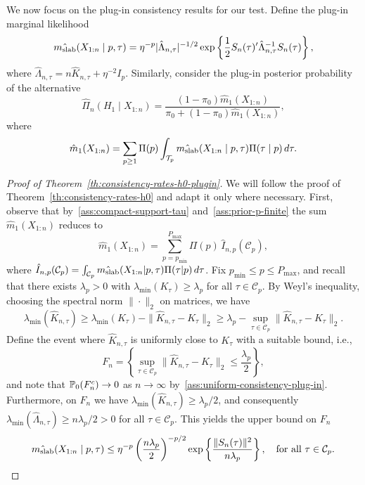 We now focus on the plug-in consistency results for our test. Define the plug-in marginal likelihood
\[
\hat {m_{\text{slab}}}(X_{1:n}\mid p,\tau) = \eta^{-p}|\hat\Lambda_{n,\tau}|^{-1/2}\exp\left\{\frac{1}{2}S_n(\tau)'\hat\Lambda_{n,\tau}^{-1}S_n(\tau)\right\},
\]
where \(\hat\Lambda_{n,\tau} = n\hat K_{n,\tau} + \eta^{-2}I_p \). Similarly, consider the plug-in posterior probability of the alternative
\[
\hat\Pi_n(H_1\mid X_{1:n}) = \frac{(1-\pi_0)\hat m_1(X_{1:n})}{\pi_0 + (1-\pi_0)\hat m_1(X_{1:n})},
\]
where
\[
\hat m_1(X_{1:n}) = \sum_{p\geq 1}\Pi(p)\int_{\mathcal T_p}\hat {m_{\text{slab}}}(X_{1:n}\mid p,\tau)\Pi(\tau\mid p)\,d\tau.
\]

\begin{proof}[Proof of Theorem~\ref{th:consistency-rates-h0-plugin}]\label{proof:consistency-rates-h0-plugin}
  We will follow the proof of Theorem~\ref{th:consistency-rates-h0} and adapt it only where necessary. First, observe that by~\ref{ass:compact-support-tau} and~\ref{ass:prior-p-finite} the sum \(\hat m_1(X_{1:n})\) reduces to
\[
\hat m_1(X_{1:n}) = \sum_{p=p_{\min}}^{P_{\max}} \Pi(p)\,\hat I_{n,p}(\mathcal C_p),
\]
where \(\hat I_{n,p}(\mathcal C_p)=\int_{\mathcal C_p}\hat {m_{\text{slab}}}(X_{1:n}|p,\tau)\Pi(\tau|p)\,d\tau\). Fix \(p_{\min} \leq p\leq P_{\max}\), and recall that there exists \(\lambda_p>0\) with \(\lambda_{\min}(K_\tau)\geq \lambda_p\) for all \(\tau\in \mathcal C_p\). By Weyl's inequality, choosing the spectral norm \(\|\cdot\|_2\) on matrices, we have
\[
\lambda_{\min}(\hat K_{n,\tau}) \geq \lambda_{\min}(K_\tau) - \|\hat K_{n,\tau} - K_\tau\|_2 \geq \lambda_p - \sup_{\tau\in \mathcal C_p}\|\hat K_{n,\tau} - K_\tau\|_2.
\]
Define the event where \(\hat K_{n,\tau}\) is uniformly close to \(K_\tau\) with a suitable bound, i.e.,
\[
F_n = \left\{\sup_{\tau\in \mathcal C_p}\|\hat K_{n,\tau} - K_\tau\|_2 \leq \frac{\lambda_p}{2}\right\},
\]
and note that \(\mathbb{P}_0(F_n^c)\to 0\) as \(n\to\infty\) by~\ref{ass:uniform-consistency-plug-in}. Furthermore, on \(F_n\) we have \(\lambda_{\min}(\hat K_{n,\tau})\geq \lambda_p/2\), and consequently \(\lambda_{\min}(\hat\Lambda_{n,\tau})\geq n\lambda_p/2>0\) for all \(\tau\in \mathcal C_p\). This yields the upper bound on \(F_n\)
\begin{equation}\label{eq:upper-bound-m-slab-plugin}
\hat {m_{\text{slab}}}(X_{1:n}\mid p,\tau) \leq \eta^{-p}\left(\frac{n\lambda_p}{2}\right)^{-p/2}\exp\left\{\frac{\|S_n(\tau)\|^2}{n\lambda_p}\right\}, \quad \text{for all }\tau\in \mathcal C_p.
\end{equation}


\end{proof}
